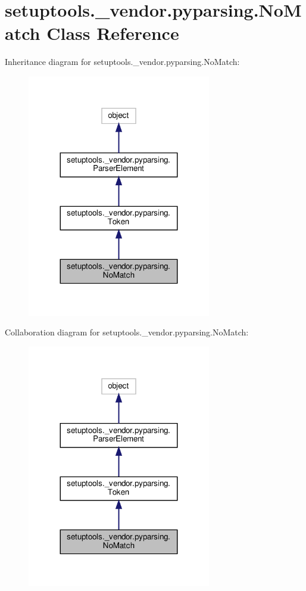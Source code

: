 \hypertarget{classsetuptools_1_1__vendor_1_1pyparsing_1_1NoMatch}{}\section{setuptools.\+\_\+vendor.\+pyparsing.\+No\+Match Class Reference}
\label{classsetuptools_1_1__vendor_1_1pyparsing_1_1NoMatch}


Inheritance diagram for setuptools.\+\_\+vendor.\+pyparsing.\+No\+Match\+:
\nopagebreak
\begin{figure}[H]
\begin{center}
\leavevmode
\includegraphics[width=227pt]{classsetuptools_1_1__vendor_1_1pyparsing_1_1NoMatch__inherit__graph}
\end{center}
\end{figure}


Collaboration diagram for setuptools.\+\_\+vendor.\+pyparsing.\+No\+Match\+:
\nopagebreak
\begin{figure}[H]
\begin{center}
\leavevmode
\includegraphics[width=227pt]{classsetuptools_1_1__vendor_1_1pyparsing_1_1NoMatch__coll__graph}
\end{center}
\end{figure}
